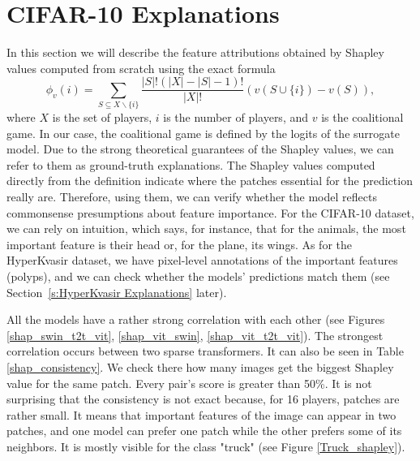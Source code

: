 \documentclass[magisterska,en]{pracamgr}
\begin{document}
\section{CIFAR-10 Explanations}
In this section we will describe the feature attributions obtained by Shapley values computed from scratch using the exact formula
  \begin{equation*}
      \phi_v(i) = \sum_{S\subseteq X\backslash \{i\}} \frac{|S|!(|X|-|S|-1)!}{|X|!}\left(v(S \cup \{i\}) - v(S)\right),
  \end{equation*}
where $X$ is the set of players, $i$ is the number of players, and $v$ is the coalitional game. In our case, the coalitional game is defined by the logits of the surrogate model. Due to the strong theoretical guarantees of the Shapley values, we can refer to them as ground-truth explanations. The Shapley values computed directly from the definition indicate where the patches essential for the prediction really are. Therefore, using them, we can verify whether the model reflects commonsense presumptions about feature importance. For the CIFAR-10 dataset, we can rely on intuition, which says, for instance, that for the animals, the most important feature is their head or, for the plane, its wings. As for the HyperKvasir dataset, we have pixel-level annotations of the important features (polyps), and we can check whether the models' predictions match them (see Section~\ref{s:HyperKvasir Explanations} later).





All the models have a rather strong correlation with each other (see Figures \ref{shap_swin_t2t_vit}, \ref{shap_vit_swin}, \ref{shap_vit_t2t_vit}). The strongest correlation occurs between two sparse transformers. It can also be seen in Table \ref{shap_consistency}. We check there how many images get the biggest Shapley value for the same patch. Every pair's score is greater than 50\%. It is not surprising that the consistency is not exact because, for 16 players, patches are rather small. It means that important features of the image can appear in two patches, and one model can prefer one patch while the other prefers some of its neighbors. It is mostly visible for the class "truck" (see Figure \ref{Truck_shapley}).
\end{document}
